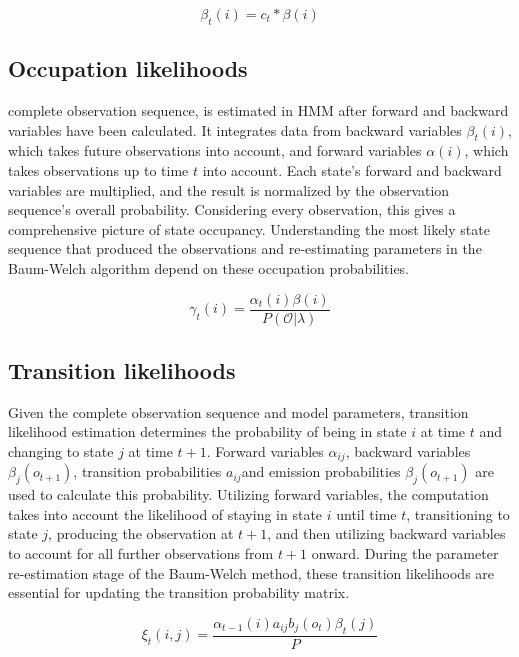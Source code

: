 \documentclass{article}
\begin{document}
\begin{equation}
	\beta_t(i) = c_t * \beta(i)
\end{equation}

\subsection{Occupation likelihoods}

complete observation sequence, is estimated in HMM after forward and backward variables have been calculated. It integrates data from backward variables $\beta_t(i)$, which takes future observations into account, and forward variables $\alpha(i)$, which takes observations up to time $t$ into account. Each state's forward and backward variables are multiplied, and the result is normalized by the observation sequence's overall probability. Considering every observation, this gives a comprehensive picture of state occupancy. Understanding the most likely state sequence that produced the observations and re-estimating parameters in the Baum-Welch algorithm depend on these occupation probabilities.

\begin{equation}
	\gamma_t(i) = \frac{\alpha_t(i)\beta(i)}{P(\mathcal{O}|\lambda)}
\end{equation}


\subsection{Transition likelihoods}

Given the complete observation sequence and model parameters, transition likelihood estimation determines the probability of being in state $i$ at time $t$ and changing to state $j$ at time $t+1$. Forward variables $\alpha_{ij}$, backward variables $\beta_j(o_{t+1})$, transition probabilities $a_{ij}$and emission probabilities $\beta_j(o_{t+1})$ are used to calculate this probability. Utilizing forward variables, the computation takes into account the likelihood of staying in state $i$ until time $t$, transitioning to state $j$, producing the observation at $t+1$, and then utilizing backward variables to account for all further observations from $t+1$ onward. During the parameter re-estimation stage of the Baum-Welch method, these transition likelihoods are essential for updating the transition probability matrix.

\begin{equation}
	\xi_t(i,j) = \frac{\alpha_{t-1}(i)a_{ij}b_j(o_t)\beta_t(j)}{P}
\end{equation}
\end{document}
